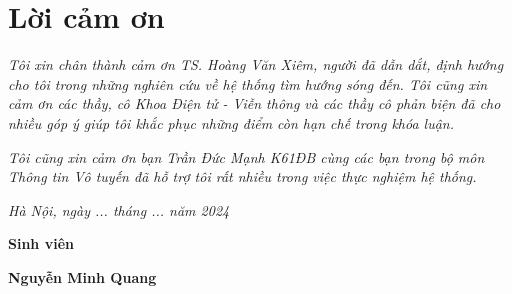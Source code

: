 \clearpage
{}

\chapter*{Lời cảm ơn}

\textit{Tôi xin chân thành cảm ơn TS. Hoàng Văn Xiêm, người đã dẫn dắt, định hướng cho tôi trong những nghiên cứu về hệ thống tìm hướng sóng đến. Tôi cũng xin cảm ơn các thầy, cô Khoa Điện tử - Viễn thông và các thầy cô phản biện đã cho nhiều góp ý giúp tôi khắc phục những điểm còn hạn chế trong khóa luận.}

\textit{Tôi cũng xin cảm ơn bạn Trần Đức Mạnh K61ĐB cùng các bạn trong bộ môn Thông tin Vô tuyến đã hỗ trợ tôi rất nhiều trong việc thực nghiệm hệ thống.}

\vspace{1cm}
\hspace{7cm}\textit{Hà Nội, ngày ... tháng ... năm 2024}

\hspace{9.4cm}\textbf{Sinh viên}
\vspace{2.5cm}


\hspace{8.5cm}\textbf{Nguyễn Minh Quang}

